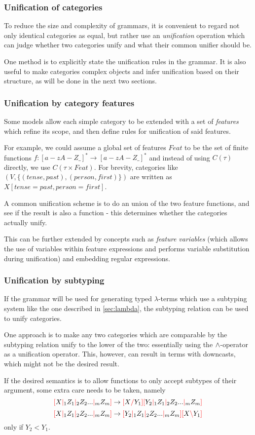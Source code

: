 \documentclass[main.tex]{subfiles}
\begin{document}
\subsubsection{Unification of categories}
To reduce the size and complexity of grammars, it is convenient to regard
not only identical categories as equal, but rather use an \emph{unification}
operation which can judge whether two categories unify and what their common
unifier should be.

One method is to explicitly state the unification rules in the grammar.
It is also useful to make categories complex objects and infer unification
based on their structure, as will be done in the next two sections.

\subsubsection{Unification by category features}
Some models allow each simple category to be extended with a set of \emph{features}
which refine its scope, and then define rules for unification of said features.

For example, we could assume a global set of features $Feat$ to be the
set of finite functions $f: [a-zA-Z\_]^* \rightarrow [a-zA-Z\_]^*$
and instead of using $C(\tau)$ directly, we use $C(\tau \times Feat)$.
For brevity, categories like $(V, \{ (tense, past), (person, first) \})$
are written as $X[tense=past, person=first]$.

A common unification scheme is to do an union of the two feature functions,
and see if the result is also a function - this determines whether the
categories actually unify.

This can be further extended by concepts such as \emph{feature variables}
(which allows the use of variables within feature expressions and
performs variable substitution during unification) and embedding regular expressions.

\subsubsection{Unification by subtyping}
If the grammar will be used for generating typed $\lambda$-terms which use
a subtyping system like the one described in \autoref{sec:lambda}, the subtyping
relation can be used to unify categories.

One approach is to make any two categories which are comparable by the subtyping
relation unify to the lower of the two: essentially using the $\wedge$-operator
as a unification operator. This, however, can result in terms with downcasts,
which might not be the desired result.

If the desired semantics is to allow functions to only accept subtypes of
their argument, some extra care needs to be taken, namely
\[ \textcolor{red}{[} X \textcolor{red}{|}_1 Z_1 \textcolor{red}{|}_2 Z_2 ... \textcolor{red}{|}_m Z_m \textcolor{red}{]} \rightarrow \textcolor{red}{[} X \textcolor{red}{/} Y_1 \textcolor{red}{]} \textcolor{red}{[} Y_2 \textcolor{red}{|}_1 Z_1 \textcolor{red}{|}_2 Z_2 ... \textcolor{red}{|}_m Z_m \textcolor{red}{]} \]
\[ \textcolor{red}{[} X \textcolor{red}{|}_1 Z_1 \textcolor{red}{|}_2 Z_2 ... \textcolor{red}{|}_m Z_m \textcolor{red}{]} \rightarrow \textcolor{red}{[} Y_2 \textcolor{red}{|}_1 Z_1 \textcolor{red}{|}_2 Z_2 ... \textcolor{red}{|}_m Z_m \textcolor{red}{]} \textcolor{red}{[} X \textcolor{red}{\backslash} Y_1 \textcolor{red}{]} \]
only if $Y_2 \less Y_1$.
\end{document}
